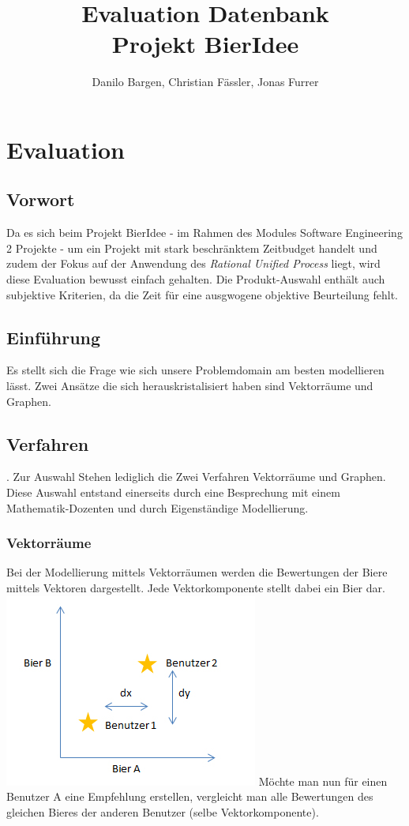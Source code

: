 \documentclass[10pt,a4paper]{scrartcl}
\author{Danilo Bargen, Christian Fässler, Jonas Furrer}
\title{Evaluation Datenbank\\Projekt BierIdee}
\begin{document}
\begin{titlepage}
	\maketitle
	\vspace{120mm}
	\thispagestyle{empty} %
\end{titlepage}

\section{Evaluation}
\subsection{Vorwort}
Da es sich beim Projekt BierIdee - im Rahmen des Modules Software Engineering 2 Projekte - um ein Projekt mit stark beschränktem Zeitbudget handelt und zudem der Fokus auf der Anwendung des \textit{Rational Unified Process} liegt, wird diese Evaluation bewusst einfach gehalten. Die Produkt-Auswahl enthält auch subjektive Kriterien, da die Zeit für eine ausgwogene objektive Beurteilung fehlt.

\subsection{Einführung}
Es stellt sich die Frage wie sich unsere Problemdomain am besten modellieren lässt. Zwei Ansätze die sich herauskristalisiert haben sind Vektorräume und Graphen.


\subsection{Verfahren}. 
Zur Auswahl Stehen lediglich die Zwei Verfahren Vektorräume und Graphen. Diese Auswahl entstand einerseits durch eine Besprechung mit einem Mathematik-Dozenten und durch Eigenständige Modellierung.
\subsubsection{Vektorräume}
Bei der Modellierung mittels Vektorräumen werden die Bewertungen der Biere mittels Vektoren dargestellt. Jede Vektorkomponente stellt dabei ein Bier dar.
\includegraphics[scale=1]{vektor.jpg} 
Möchte man nun für einen Benutzer A eine Empfehlung erstellen, vergleicht man alle Bewertungen des gleichen Bieres der anderen Benutzer (selbe Vektorkomponente).
\end{document}
